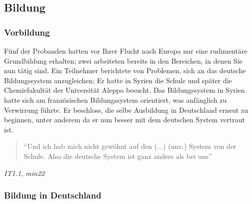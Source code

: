 \subsection{Bildung}


\subsubsection{Vorbildung}
Fünf der Probanden hatten vor Ihrer Flucht nach Europa nur eine rudimentäre Grundbildung erhalten; zwei arbeiteten bereits in den Bereichen, in denen Sie nun tätig sind.\newline
Ein Teilnehmer berichtete von Problemen, sich an das deutsche Bildungssystem anzugleichen; Er hatte in Syrien die Schule und später die Chemiefakultät der Universität Aleppo besucht. Das Bildungssystem in Syrien hatte sich am französischen Bildungssystem orientiert, was anfänglich zu Verwirrung führte.
Er beschloss, die selbe Ausbildung in Deutschland erneut zu beginnen, unter anderem da er nun besser mit dem deutschen System vertraut ist.

\begin{quote}
    ``Und ich hab mich nicht gewöhnt auf den (...) (unv.) System von der Schule. Also die deutsche System ist ganz anders als bei uns''
\end{quote}
\centerline{\textit{IT1.1, min22}}
\subsubsection{Bildung in Deutschland}

